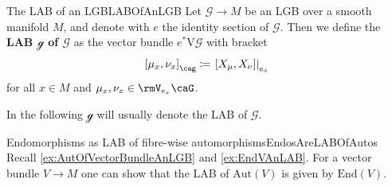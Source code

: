\documentclass[reqno,a4paper,oneside]{amsart}
\theoremstyle{plain}
\theoremstyle{remark}
\theoremstyle{definition}
\begin{document}
\begin{definitions}{The LAB of an LGB}{LABOfAnLGB}
Let $\mathcal{G} \to M$ be an LGB over a smooth manifold $M$, and denote with $e$ the identity section of $\mathcal{G}$. Then we define the \textbf{LAB $\mathcal{g}$ of $\mathcal{G}$} as the vector bundle $e^*\mathrm{V}\mathcal{G}$ with bracket 
\begin{equation*}
\mleft[ \mu_x, \nu_x \mright]_{\cag}
\coloneqq
\mleft.\mleft[ X_\mu, X_\nu \mright]\mright|_{e_x}
\end{equation*}
for all $x \in M$ and $\mu_x, \nu_x \in \rmV_{e_x}\caG$.
\end{definitions}

In the following $\mathcal{g}$ will usually denote the LAB of $\mathcal{G}$.

\begin{examples}{Endomorphisms as LAB of fibre-wise automorphisms}{EndosAreLABOfAutos}
Recall \ref{ex:AutOfVectorBundleAnLGB} and \ref{ex:EndVAnLAB}. For a vector bundle $V \to M$ one can show that the LAB of $\mathrm{Aut}(V)$ is given by $\mathrm{End}(V)$. 
\end{examples}
\end{document}

